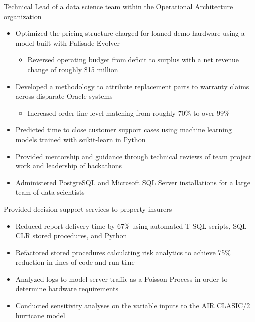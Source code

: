 \documentclass[10pt,a4paper,sans]{moderncv}        %
\begin{document}
{Technical Lead of a data science team within the Operational Architecture organization
\begin{itemize}
	\item Optimized the pricing structure charged for loaned demo hardware using a model built with Palisade Evolver
	\begin{itemize}
		\item Reversed operating budget from deficit to surplus with a net revenue change of roughly \$15 million
	\end{itemize}
	\item Developed a methodology to attribute replacement parts to warranty claims across disparate Oracle systems
	\begin{itemize}
		\item Increased order line level matching from roughly 70\% to over 99\%
	\end{itemize}
	\item Predicted time to close customer support cases using machine learning models trained with scikit-learn in Python
	\item Provided mentorship and guidance through technical reviews of team project work and leadership of hackathons
	\item Administered PostgreSQL and Microsoft SQL Server installations for a large team of data scientists
\end{itemize}}

{Provided decision support services to property insurers
\begin{itemize}
	\item Reduced report delivery time by 67\% using automated T-SQL scripts, SQL CLR stored procedures, and Python
	\item Refactored stored procedures calculating risk analytics to achieve 75\% reduction in lines of code and run time
	\item Analyzed logs to model server traffic as a Poisson Process in order to determine hardware requirements
	\item Conducted sensitivity analyses on the variable inputs to the AIR CLASIC/2 hurricane model
\end{itemize}}

\end{document}
